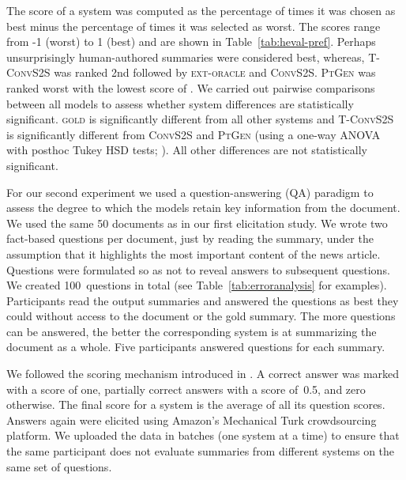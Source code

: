 \documentclass[11pt,a4paper]{article}
\begin{document}
The score of a system was computed as the percentage of times it was
chosen as best minus the percentage of times it was selected as
worst. The scores range from -1 (worst) to 1 (best) and are shown in
Table~\ref{tab:heval-pref}. Perhaps unsurprisingly human-authored
summaries were considered best, whereas, \textsc{T-ConvS2S} was ranked
2nd followed by \textsc{ext-oracle} and
\textsc{ConvS2S}. \textsc{PtGen} was ranked worst with the lowest
score of . We carried out pairwise comparisons between all
models to assess whether system differences are statistically
significant. \textsc{gold} is significantly different from all other
systems and \textsc{T-ConvS2S} is significantly different from
\textsc{ConvS2S} and \textsc{PtGen} (using a one-way ANOVA with
posthoc Tukey HSD tests; ). All other differences are not
statistically significant.








For our second experiment we used a question-answering (QA) paradigm
\cite{Clarke:Lapata:2010,narayan-rank18} to assess the degree to which
the models retain key information from the document. We used the same
50 documents as in our first elicitation study.  We wrote two
fact-based questions per document, just by reading the summary, under
the assumption that it highlights the most important content of the
news article. Questions were formulated so as not to reveal answers to
subsequent questions.  We created 100~questions in total (see
Table~\ref{tab:erroranalysis} for examples). Participants read the
output summaries and answered the questions as best they could without
access to the document or the gold summary. The more questions can be
answered, the better the corresponding system is at summarizing the
document as a whole.  Five participants answered questions for each
summary.

We followed the scoring mechanism introduced in
. A correct answer was marked with a score
of one, partially correct answers with a score of~0.5, and zero
otherwise. The final score for a system is the average of all its
question scores. Answers again were elicited using Amazon's Mechanical
Turk crowdsourcing platform. We uploaded the data in batches (one
system at a time) to ensure that the same participant does not
evaluate summaries from different systems on the same set of
questions.
\end{document}
